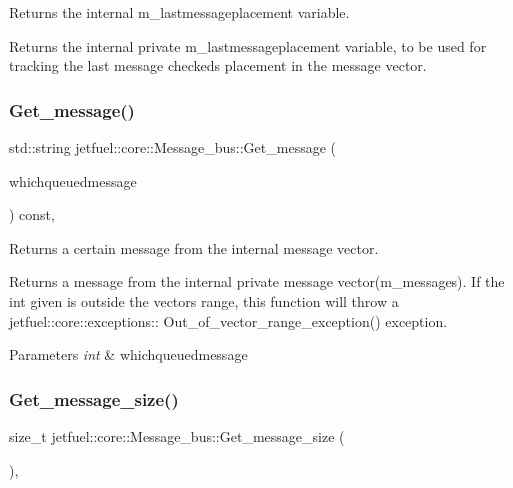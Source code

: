 Returns the internal m\+\_\+lastmessageplacement variable. 

Returns the internal private m\+\_\+lastmessageplacement variable, to be used for tracking the last message checked\textquotesingle{}s placement in the message vector. \mbox{\label{classjetfuel_1_1core_1_1Message__bus_a36316ce1a4ddbd9a36c39f82e81a7f23}} 
\subsubsection{\texorpdfstring{Get\+\_\+message()}{Get\_message()}}
{\footnotesize\ttfamily std\+::string jetfuel\+::core\+::\+Message\+\_\+bus\+::\+Get\+\_\+message (\begin{DoxyParamCaption}\item[{const int}]{whichqueuedmessage }\end{DoxyParamCaption}) const\hspace{0.3cm}{\ttfamily [inline]}, {\ttfamily [protected]}}



Returns a certain message from the internal message vector. 

Returns a message from the internal private message vector(m\+\_\+messages). If the int given is outside the vector\textquotesingle{}s range, this function will throw a jetfuel\+::core\+::exceptions\+:\+: Out\+\_\+of\+\_\+vector\+\_\+range\+\_\+exception() exception.


\begin{DoxyParams}{Parameters}
{\em int} & whichqueuedmessage \\
\hline
\end{DoxyParams}
\mbox{\label{classjetfuel_1_1core_1_1Message__bus_a784a11d711a1df93b66416c93b9fd494}} 
\subsubsection{\texorpdfstring{Get\+\_\+message\+\_\+size()}{Get\_message\_size()}}
{\footnotesize\ttfamily size\+\_\+t jetfuel\+::core\+::\+Message\+\_\+bus\+::\+Get\+\_\+message\+\_\+size (\begin{DoxyParamCaption}{ }\end{DoxyParamCaption})\hspace{0.3cm}{\ttfamily [inline]}, {\ttfamily [protected]}}



